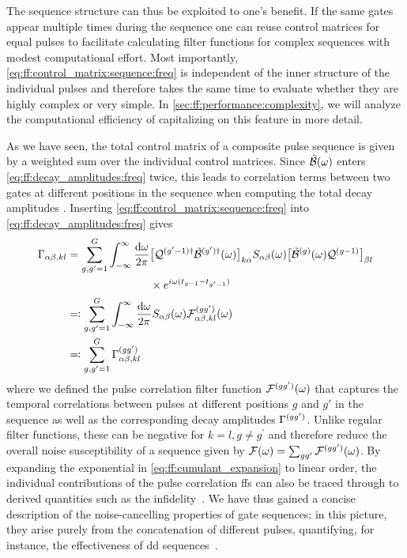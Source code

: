 The sequence structure can thus be exploited to one's benefit.
If the same gates appear multiple times during the sequence one can reuse control matrices for equal pulses to facilitate calculating filter functions for complex sequences with modest computational effort.
Most importantly, \cref{eq:ff:control_matrix:sequence:freq} is independent of the inner structure of the individual pulses and therefore takes the same time to evaluate whether they are highly complex or very simple.
In \cref{sec:ff:performance:complexity}, we will analyze the computational efficiency of capitalizing on this feature in more detail.

As we have seen, the total control matrix of a composite pulse sequence is given by a weighted sum over the individual control matrices.
Since $\tilde{\mathcal{B}}(\omega)$ enters \cref{eq:ff:decay_amplitudes:freq} twice, this leads to correlation terms between two gates at different positions in the sequence when computing the total decay amplitudes \decayamps.
Inserting \cref{eq:ff:control_matrix:sequence:freq} into \cref{eq:ff:decay_amplitudes:freq} gives
\begin{align}
    \Gamma_{\alpha\beta,kl} &= \begin{aligned}[t]
        \sum_{g,g^\prime=1}^{G}\int_{-\infty}^\infty\frac{\dd{\omega}}{2\pi} &
        \bigl[\mathcal{Q}^{(g^\prime-1)\dagger}\tilde{\mathcal{B}}^{(g^\prime)\dagger}(\omega)\bigr]_{k\alpha}
        S_{\alpha\beta}(\omega)
        \bigl[\tilde{\mathcal{B}}^{(g)}(\omega)\mathcal{Q}^{(g-1)}\bigr]_{\beta l} \\
        &\times e^{i\omega(t_{g-1} - t_{g^\prime-1})} \\
    \end{aligned} \notag\\
    &\eqqcolon\sum_{g,g^\prime=1}^{G}\int_{-\infty}^\infty\frac{\dd{\omega}}{2\pi} S_{\alpha\beta}(\omega) \mathcal{F}_{\alpha\beta,kl}^{(gg^\prime)}(\omega) \label{eq:ff:decay_amplitudes:pulse_correlation}\\
    &\eqqcolon\sum_{g,g^\prime=1}^{G}\Gamma_{\alpha\beta,kl}^{(gg^\prime)}
\end{align}
where we defined the pulse correlation filter function $\mathcal{F}^{(gg^\prime)}(\omega)$ that captures the temporal correlations between pulses at different positions $g$ and $g'$ in the sequence as well as the corresponding decay amplitudes $\Gamma^{(gg^\prime)}$.
Unlike regular filter functions, these can be negative for $k=l, g\neq g^\prime$ and therefore reduce the overall noise susceptibility of a sequence given by $\mathcal{F}(\omega) = \sum_{gg^\prime}\mathcal{F}^{(gg^\prime)}(\omega)$.
By expanding the exponential in \cref{eq:ff:cumulant_expansion} to linear order, the individual contributions of the pulse correlation \glspl{ff} can also be traced through to derived quantities such as the infidelity~\cite[Equation 11]{Cerfontaine2021}.
We have thus gained a concise description of the noise-cancelling properties of gate sequences: in this picture, they arise purely from the concatenation of different pulses, quantifying, for instance, the effectiveness of \gls{dd} sequences~\cite{Cerfontaine2021}.

